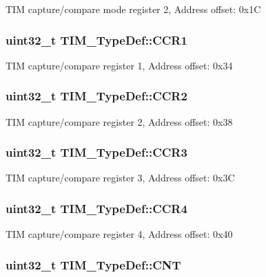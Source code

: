 T\-I\-M capture/compare mode register 2, Address offset\-: 0x1\-C \hypertarget{struct_t_i_m___type_def_a0dd9c06729a5eb6179c6d0d60faca7ed}{
\subsubsection[{C\-C\-R1}]{ uint32\-\_\-t T\-I\-M\-\_\-\-Type\-Def\-::\-C\-C\-R1}}\label{struct_t_i_m___type_def_a0dd9c06729a5eb6179c6d0d60faca7ed}
T\-I\-M capture/compare register 1, Address offset\-: 0x34 \hypertarget{struct_t_i_m___type_def_a4d1171e9a61538424b8ef1f2571986d0}{
\subsubsection[{C\-C\-R2}]{ uint32\-\_\-t T\-I\-M\-\_\-\-Type\-Def\-::\-C\-C\-R2}}\label{struct_t_i_m___type_def_a4d1171e9a61538424b8ef1f2571986d0}
T\-I\-M capture/compare register 2, Address offset\-: 0x38 \hypertarget{struct_t_i_m___type_def_ac83441bfb8d0287080dcbd945a272a74}{
\subsubsection[{C\-C\-R3}]{ uint32\-\_\-t T\-I\-M\-\_\-\-Type\-Def\-::\-C\-C\-R3}}\label{struct_t_i_m___type_def_ac83441bfb8d0287080dcbd945a272a74}
T\-I\-M capture/compare register 3, Address offset\-: 0x3\-C \hypertarget{struct_t_i_m___type_def_a5ba381c3f312fdf5e0b4119641b3b0aa}{
\subsubsection[{C\-C\-R4}]{ uint32\-\_\-t T\-I\-M\-\_\-\-Type\-Def\-::\-C\-C\-R4}}\label{struct_t_i_m___type_def_a5ba381c3f312fdf5e0b4119641b3b0aa}
T\-I\-M capture/compare register 4, Address offset\-: 0x40 \hypertarget{struct_t_i_m___type_def_a6fdd2a7fb88d28670b472aaac0d9d262}{
\subsubsection[{C\-N\-T}]{ uint32\-\_\-t T\-I\-M\-\_\-\-Type\-Def\-::\-C\-N\-T}}\label{struct_t_i_m___type_def_a6fdd2a7fb88d28670b472aaac0d9d262}
